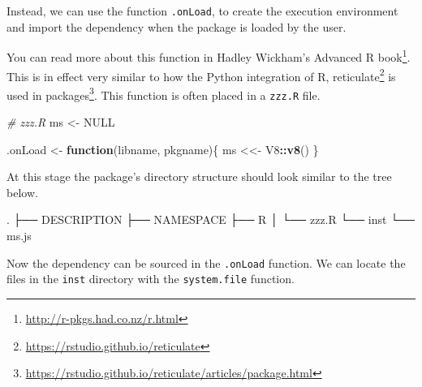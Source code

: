 \documentclass[
  10pt,
]{krantz}
\makeatletter
\newenvironment{Shaded}{\begin{snugshade}}{\end{snugshade}}
\newcommand{\CommentTok}[1]{\textcolor[rgb]{0.37,0.37,0.37}{\textit{#1}}}
\newcommand{\ControlFlowTok}[1]{\textcolor[rgb]{0.27,0.27,0.27}{\textbf{#1}}}
\newcommand{\DataTypeTok}[1]{\textcolor[rgb]{0.27,0.27,0.27}{#1}}
\newcommand{\ExtensionTok}[1]{#1}
\newcommand{\KeywordTok}[1]{\textcolor[rgb]{0.27,0.27,0.27}{\textbf{#1}}}
\newcommand{\NormalTok}[1]{#1}
\newcommand{\OperatorTok}[1]{\textcolor[rgb]{0.43,0.43,0.43}{\textbf{#1}}}
\newcommand{\OtherTok}[1]{\textcolor[rgb]{0.37,0.37,0.37}{#1}}
\newcommand{\StringTok}[1]{\textcolor[rgb]{0.5,0.5,0.5}{#1}}
\renewcommand{\href}[2]{#2\footnote{\url{#1}}}
\newenvironment{kframe}{%
\medskip{}
\setlength{\fboxsep}{.8em}
 \def\at@end@of@kframe{}%
 \ifinner\ifhmode%
  \def\at@end@of@kframe{\end{minipage}}%
  \begin{minipage}{\columnwidth}%
 \fi\fi%
 \def\FrameCommand##1{\hskip\@totalleftmargin \hskip-\fboxsep
 \colorbox{shadecolor}{##1}\hskip-\fboxsep
     \hskip-\linewidth \hskip-\@totalleftmargin \hskip\columnwidth}%
 \MakeFramed {\advance\hsize-\width
   \@totalleftmargin\z@ \linewidth\hsize
   \@setminipage}}%
 {\par\unskip\endMakeFramed%
 \at@end@of@kframe}
\renewenvironment{Shaded}{\begin{kframe}}{\end{kframe}}
\makeatother
\begin{document}
Instead, we can use the function \texttt{.onLoad}, to create the execution environment and import the dependency when the package is loaded by the user.

You can read more about this function in Hadley Wickham's \href{http://r-pkgs.had.co.nz/r.html}{Advanced R book}. This is in effect very similar to how the Python integration of R, \href{https://rstudio.github.io/reticulate}{reticulate} \citep{R-reticulate} is \href{https://rstudio.github.io/reticulate/articles/package.html}{used in packages}. This function is often placed in a \texttt{zzz.R} file.

\begin{Shaded}
\begin{Highlighting}[]
\CommentTok{\# zzz.R}
\NormalTok{ms <{-}}\StringTok{ }\OtherTok{NULL}

\NormalTok{.onLoad <{-}}\StringTok{ }\ControlFlowTok{function}\NormalTok{(libname, pkgname)\{}
\NormalTok{  ms <<{-}}\StringTok{ }\NormalTok{V8}\OperatorTok{::}\KeywordTok{v8}\NormalTok{()}
\NormalTok{\}}
\end{Highlighting}
\end{Shaded}

At this stage the package's directory structure should look similar to the tree below.

\begin{Shaded}
\begin{Highlighting}[]
\ExtensionTok{.}
\NormalTok{├── }\ExtensionTok{DESCRIPTION}
\NormalTok{├── }\ExtensionTok{NAMESPACE}
\NormalTok{├── }\ExtensionTok{R}
\NormalTok{│   └── }\ExtensionTok{zzz.R}
\NormalTok{└── }\ExtensionTok{inst}
\NormalTok{    └── }\ExtensionTok{ms.js}
\end{Highlighting}
\end{Shaded}

Now the dependency can be sourced in the \texttt{.onLoad} function. We can locate the files in the \texttt{inst} directory with the \texttt{system.file} function.

\begin{Shaded}
\end{Shaded}
\end{document}
